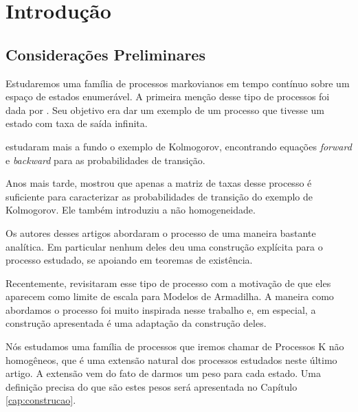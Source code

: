 \chapter{Introdução}
\label{cap:introducao}

\section{Considerações Preliminares}
\label{sec:consideracoes_preliminares}

Estudaremos uma família de processos markovianos em tempo contínuo
sobre um espaço de estados enumerável. A primeira menção desse tipo de
processos foi dada por \cite{kolmogorov:51}. Seu objetivo era dar um
exemplo de um processo que tivesse um estado com taxa de saída
infinita.

\cite{kendall:56} estudaram mais a fundo o exemplo de Kolmogorov,
encontrando equações \emph{forward} e \emph{backward} para as
probabilidades de transição.

Anos mais tarde, \cite{reuter:69} mostrou que apenas a matriz de taxas
desse processo é suficiente para caracterizar as probabilidades de
transição do exemplo de Kolmogorov. Ele também introduziu a não
homogeneidade.

Os autores desses artigos abordaram o processo de uma maneira bastante
analítica. Em particular nenhum deles deu uma construção explícita
para o processo estudado, se apoiando em teoremas de existência.

Recentemente, \cite{fontes:08} revisitaram esse tipo de processo com a
motivação de que eles aparecem como limite de escala para Modelos de
Armadilha. A maneira como abordamos o processo foi muito inspirada
nesse trabalho e, em especial, a construção apresentada é uma
adaptação da construção deles.


Nós estudamos uma família de processos que iremos chamar de Processos
K não homogêneos, que é uma extensão natural dos processos estudados
neste último artigo. A extensão vem do fato de darmos um peso para
cada estado. Uma definição precisa do que são estes pesos será
apresentada no Capítulo \ref{cap:construcao}.

